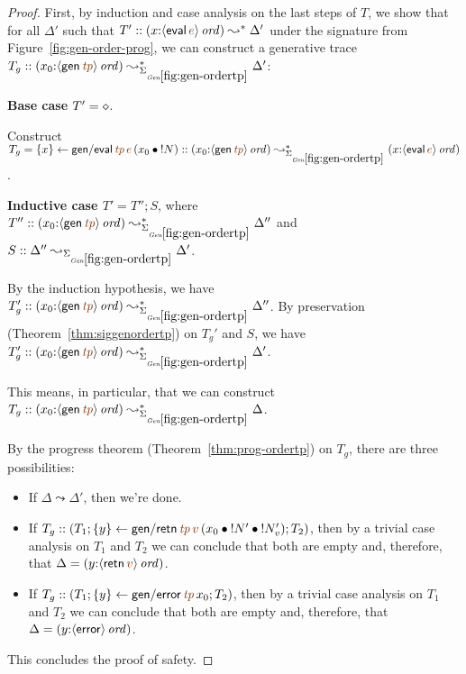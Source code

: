 \begin{proof}

  First, by induction and case analysis on the last steps of $T$, we show
  that for all $\Delta'$ such that $T' :: (x{:}\istrue{\susp{{\sf
        eval}\,\lf{e}}}) \leadsto^* \Delta'$ under the signature
  from Figure~\ref{fig:gen-order-prog}, we can construct
  a generative trace $T_g :: (x_0{:}\istrue{\susp{{\sf
        gen}\,\lf{{\it tp}}}}) \leadsto^*_{\siggenordertp} \Delta'$:

  \bigskip
  \noindent
  {\bf Base case $T' = \diamond$}.

  \smallskip
  \noindent
  Construct
  $T_g = \trstep{x}{{\sf gen/eval}\,\lf{{\it tp}}\,\lf{e}\,(\tfuser{x_0}{\tbangr{N}})}:: (x_0{:}\istrue{\susp{{\sf gen}\,\lf{{\it tp}}}})
  \leadsto^*_{\siggenordertp} (x{:}\istrue{\susp{{\sf
        eval}\,\lf{e}}})$.

  \bigskip
  \noindent
  {\bf Inductive case $T' = T''; S$}, where $T'' :: (x_0{:}\istrue{\susp{{\sf gen}\,\lf{{\it tp}}}}) \leadsto^*_{\siggenordertp} \Delta''$ and $S :: \Delta'' \leadsto_{\siggenordertp} \Delta'$. 

  \smallskip
  \noindent
  By the induction hypothesis, we have $T_g' :: (x_0{:}\istrue{\susp{{\sf gen}\,\lf{{\it tp}}}}) \leadsto_{\siggenordertp}^*
  \Delta''$. By preservation (Theorem~\ref{thm:siggenordertp}) on 
  $T_g'$ and $S$, we have $T_g' :: (x_0{:}\istrue{\susp{{\sf gen}\,\lf{{\it tp}}}}) \leadsto_{\siggenordertp}^*
  \Delta'$.

  \bigskip
  \noindent
  This means, in particular, that we can construct 
  $T_g :: (x_0{:}\istrue{\susp{{\sf gen}\,\lf{{\it tp}}}}) \leadsto_{\siggenordertp}^*
  \Delta$. 

  \bigskip
  \noindent
  By the progress theorem (Theorem~\ref{thm:prog-ordertp}) on $T_g$, 
  there are three possibilities:
  \begin{itemize}
  \item If $\Delta \leadsto \Delta'$, then we're done.
  \item If $T_g :: (T_1; \trstep{y}{{\sf gen/retn}\,\lf{{\it tp}}\,\lf{v}\,(\tfuser{x_0}{\tfuser{\tbangr{N'}}{\tbangr{N_v'}}})}; T_2)$, then by a trivial case analysis on $T_1$ and $T_2$ we can conclude that both are empty and, therefore, that $\Delta = (y{:}\istrue{\susp{{\sf retn}\,\lf{v}}})$.
  \item If $T_g :: (T_1; \trstep{y}{{\sf gen/error}\,\lf{{\it tp}}\,x_0}; T_2)$, then by a trivial case analysis on $T_1$ and $T_2$ we can conclude that both are empty and, therefore, that $\Delta = (y{:}{\langle {{\sf error}} \rangle}\,{{\it ord}})$.
  \end{itemize}

  \noindent
  This concludes the proof of safety.
\end{proof}
